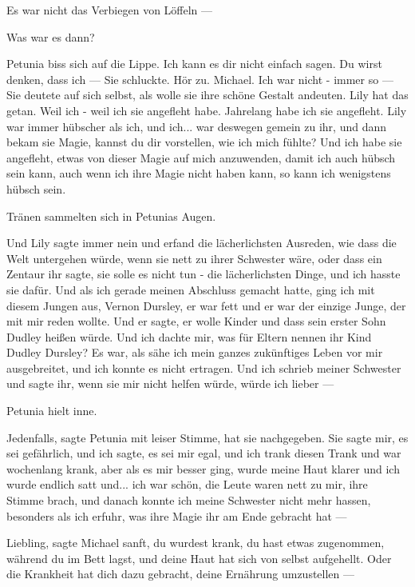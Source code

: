 \glqq Es war nicht das Verbiegen von Löffeln ---\grqq{}

\glqq Was war es dann?\grqq{}

Petunia biss sich auf die Lippe. \glqq Ich kann es dir nicht einfach sagen. Du
wirst denken, dass ich ---\grqq{} Sie schluckte. \glqq Hör zu. Michael. Ich war
nicht - immer so ---\grqq{} Sie deutete auf sich selbst, als wolle sie ihre
schöne Gestalt andeuten. \glqq Lily hat das getan. Weil ich - weil ich sie
angefleht habe. Jahrelang habe ich sie angefleht. Lily war immer hübscher als
ich, und ich... war deswegen gemein zu ihr, und dann bekam sie Magie, kannst du
dir vorstellen, wie ich mich fühlte? Und ich habe sie angefleht, etwas von
dieser Magie auf mich anzuwenden, damit ich auch hübsch sein kann, auch wenn ich
ihre Magie nicht haben kann, so kann ich wenigstens hübsch sein.\grqq{}

Tränen sammelten sich in Petunias Augen.

\glqq Und Lily sagte immer nein und erfand die lächerlichsten Ausreden, wie dass
die Welt untergehen würde, wenn sie nett zu ihrer Schwester wäre, oder dass ein
Zentaur ihr sagte, sie solle es nicht tun - die lächerlichsten Dinge, und ich
hasste sie dafür. Und als ich gerade meinen Abschluss gemacht hatte, ging ich
mit diesem Jungen aus, Vernon Dursley, er war fett und er war der einzige Junge,
der mit mir reden wollte. Und er sagte, er wolle Kinder und dass sein erster
Sohn Dudley heißen würde. Und ich dachte mir, was für Eltern nennen ihr Kind
Dudley Dursley? Es war, als sähe ich mein ganzes zukünftiges Leben vor mir
ausgebreitet, und ich konnte es nicht ertragen. Und ich schrieb meiner Schwester
und sagte ihr, wenn sie mir nicht helfen würde, würde ich lieber ---\grqq{}

Petunia hielt inne.

\glqq Jedenfalls\grqq{}, sagte Petunia mit leiser Stimme, \glqq hat sie
nachgegeben. Sie sagte mir, es sei gefährlich, und ich sagte, es sei mir egal,
und ich trank diesen Trank und war wochenlang krank, aber als es mir besser
ging, wurde meine Haut klarer und ich wurde endlich satt und... ich war schön,
die Leute waren nett zu mir\grqq{}, ihre Stimme brach, \glqq und danach konnte
ich meine Schwester nicht mehr hassen, besonders als ich erfuhr, was ihre Magie
ihr am Ende gebracht hat ---\grqq{}

\glqq Liebling\grqq{}, sagte Michael sanft, \glqq du wurdest krank, du hast
etwas zugenommen, während du im Bett lagst, und deine Haut hat sich von selbst
aufgehellt. Oder die Krankheit hat dich dazu gebracht, deine Ernährung
umzustellen ---\grqq{}

